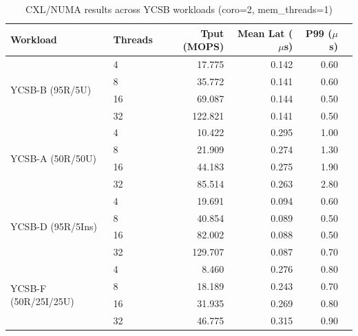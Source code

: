 \documentclass[11pt,a4paper]{article}
\begin{document}
\begin{table}[H]
\centering
\caption{CXL/NUMA results across YCSB workloads (coro=2, mem\_threads=1)}
\label{tab:numa-ycsb-all}
\small
\begin{tabular}{@{}llrrrr@{}}
\toprule
\textbf{Workload} & \textbf{Threads} & \textbf{Tput (MOPS)} & \textbf{Mean Lat ($\mu$s)} & \textbf{P99 ($\mu$s)} \\
\midrule
\multirow{4}{*}{YCSB-B (95R/5U)} & 4  & 17.775 & 0.142 & 0.60 \\
  & 8  & 35.772 & 0.141 & 0.60 \\
  & 16 & 69.087 & 0.144 & 0.50 \\
  & 32 & 122.821 & 0.141 & 0.50 \\
\midrule
\multirow{4}{*}{YCSB-A (50R/50U)} & 4  & 10.422 & 0.295 & 1.00 \\
  & 8  & 21.909 & 0.274 & 1.30 \\
  & 16 & 44.183 & 0.275 & 1.90 \\
  & 32 & 85.514 & 0.263 & 2.80 \\
\midrule
\multirow{4}{*}{YCSB-D (95R/5Ins)} & 4  & 19.691 & 0.094 & 0.60 \\
  & 8  & 40.854 & 0.089 & 0.50 \\
  & 16 & 82.002 & 0.088 & 0.50 \\
  & 32 & 129.707 & 0.087 & 0.70 \\
\midrule
\multirow{4}{*}{YCSB-F (50R/25I/25U)} & 4  & 8.460 & 0.276 & 0.80 \\
  & 8  & 18.189 & 0.243 & 0.70 \\
  & 16 & 31.935 & 0.269 & 0.80 \\
  & 32 & 46.775 & 0.315 & 0.90 \\
\bottomrule
\end{tabular}
\end{table}
\end{document}
